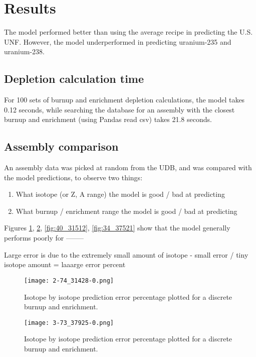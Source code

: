 \section{Results}

The model performed better than using the average
recipe in predicting the U.S. \gls{UNF}. However,
the model underperformed in predicting uranium-235
and uranium-238.


\subsection{Depletion calculation time}

For 100 sets of
burnup and enrichment depletion calculations,
the model takes 0.12 seconds, while
searching the database for an assembly
with the closest burnup and enrichment (using Pandas read csv)
takes 21.8 seconds.

\subsection{Assembly comparison}

An assembly data was picked at random from the \gls{UDB},
and was compared with the model predictions, to observe
two things:
\begin{enumerate}
    \item What isotope (or Z, A range) the model is good / bad 
        at predicting
    \item What burnup / enrichment range the model is good / bad
        at predicting
\end{enumerate}

Figures \ref{fig:274_31528}, \ref{fig:373_37925},
\ref{fig:40_31512}, \ref{fig:34_37521} show that the model
generally performs poorly for --------

Large error is due to the extremely small amount of isotope
- small error / tiny isotope amount = laaarge error percent 

\begin{figure}
    \centering
    \texttt{[image: 2-74\_31428-0.png]}
    \caption{Isotope by isotope prediction error percentage
             plotted for a discrete burnup and enrichment.
             }
    \label{fig:274_31528}
\end{figure}



\begin{figure}
    \centering
    \texttt{[image: 3-73\_37925-0.png]}
    \caption{Isotope by isotope prediction error percentage
             plotted for a discrete burnup and enrichment.
             }
    \label{fig:373_37925}
\end{figure}


